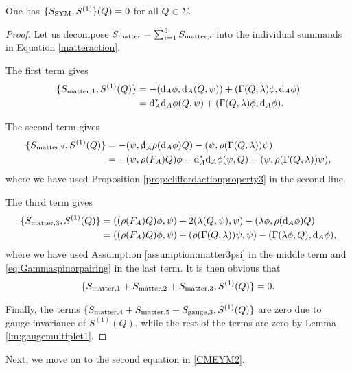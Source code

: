 \documentclass[10pt, oneside]{article}
\begin{document}
\begin{lemma} \label{lem:YM1}
One has $\{S_{\rm SYM}, S^{(1)}\} (Q) = 0$ for all $Q \in \Sigma$. 
\end{lemma}
\begin{proof}
Let us decompose $S_{\mathrm{matter}}=\sum_{i=1}^5 S_{\mathrm{matter}, i}$ into the individual summands in Equation \eqref{matteraction}. 

The first term gives
\begin{align*}
\{S_{\mathrm{matter},1}, S^{(1)}(Q)\} &= -({\rm d}_A\phi, {\rm d}_A(Q, \psi)) + (\Gamma(Q, \lambda)\phi, {\rm d}_A\phi) \\
&= {\rm d}_A^* {\rm d}_A\phi (Q, \psi) + (\Gamma(Q, \lambda)\phi, {\rm d}_A\phi).
\end{align*}

The second term gives
\begin{align*}
\{S_{\matter,2}, S^{(1)}(Q)\} &= -(\psi, \sd \d_A \rho(\d_A \phi) Q) - (\psi, \rho(\Gamma(Q, \lambda))\psi) \\
&= -(\psi, \rho(F_A) Q)\phi - \d_A^*\d_A \phi(\psi, Q) - (\psi, \rho(\Gamma(Q, \lambda))\psi),
\end{align*}
where we have used Proposition \ref{prop:cliffordactionproperty3} in the second line.

The third term gives
\begin{align*}
\{S_{\mathrm{matter},3}, S^{(1)}(Q)\} &= ((\rho(F_A)Q) \phi, \psi) + 2(\lambda(Q, \psi), \psi) - (\lambda\phi, \rho({\rm d}_A \phi) Q) \\
&= ((\rho(F_A)Q) \phi, \psi) + (\rho(\Gamma(Q, \lambda))\psi, \psi) - (\Gamma(\lambda\phi, Q), {\rm d}_A \phi),
\end{align*}
where we have used Assumption \ref{assumption:matter3psi} in the middle term and \eqref{eq:Gammaspinorpairing} in the last term. It is then obvious that
\[\{S_{\mathrm{matter},1} + S_{\mathrm{matter},2} + S_{\mathrm{matter},3}, S^{(1)}(Q)\} = 0.\]

Finally, the terms $\{S_{\mathrm{matter},4} + S_{\mathrm{matter},5} + S_{\mathrm{gauge},3}, S^{(1)}(Q)\}$ are zero due to gauge-invariance of $S^{(1)}(Q)$, while the rest of the terms are zero by Lemma \ref{lm:gaugemultiplet1}.
\end{proof}

Next, we move on to the second equation in \eqref{CMEYM2}.
\end{document}

